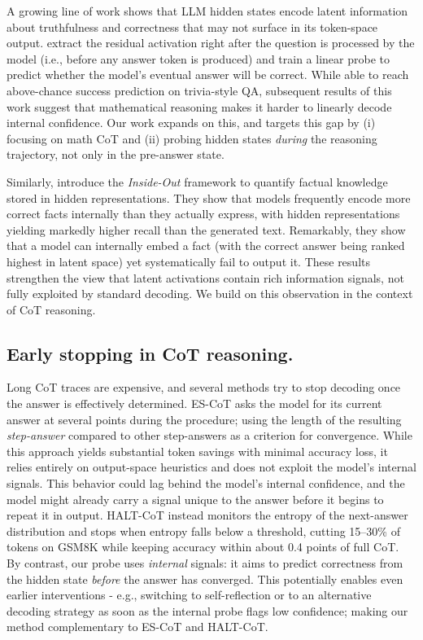 \documentclass[10pt,a4paper,twocolumn]{article}
\begin{document}
A growing line of work shows that LLM hidden states encode latent information about truthfulness and correctness that may not surface in its token-space output. \cite{cencerrado2025noanswer} extract the residual activation right after the question is processed by the model (i.e., before any answer token is produced) and train a linear probe to predict whether the model’s eventual answer will be correct. While able to reach above-chance success prediction on trivia-style QA, subsequent results of this work suggest that mathematical reasoning makes it harder to linearly decode internal confidence. Our work expands on this, and targets this gap by (i) focusing on math CoT and (ii) probing hidden states \emph{during} the reasoning trajectory, not only in the pre-answer state.

Similarly, \cite{gekhman2025insideout} introduce the \textit{Inside-Out} framework to quantify factual knowledge stored in hidden representations. They show that models frequently encode more correct facts internally than they actually express, with hidden representations yielding markedly higher recall than the generated text. Remarkably, they show that a model can internally embed a fact (with the correct answer being ranked highest in latent space) yet systematically fail to output it. These results strengthen the view that latent activations contain rich information signals, not fully exploited by standard decoding. We build on this observation in the context of CoT reasoning.

\subsection{Early stopping in CoT reasoning.}

Long CoT traces are expensive, and several methods try to stop decoding once the answer is effectively determined. ES-CoT \cite{mao2025escot} asks the model for its current answer at several points during the procedure; using the length of the resulting \textit{step-answer} compared to other step-answers as a criterion for convergence. While this approach yields substantial token savings with minimal accuracy loss, it relies entirely on output-space heuristics and does not exploit the model's internal signals. This behavior could lag behind the model's internal confidence, and the model might already carry a signal unique to the answer before it begins to repeat it in output. HALT-CoT \cite{laaouach2025haltcot} instead monitors the entropy of the next-answer distribution and stops when entropy falls below a threshold, cutting 15–30\% of tokens on GSM8K while keeping accuracy within about 0.4 points of full CoT. By contrast, our probe uses \emph{internal} signals: it aims to predict correctness from the hidden state \emph{before} the answer has converged. This potentially enables even earlier interventions - e.g., switching to self-reflection or to an alternative decoding strategy as soon as the internal probe flags low confidence; making our method complementary to ES-CoT and HALT-CoT. 
\end{document}
